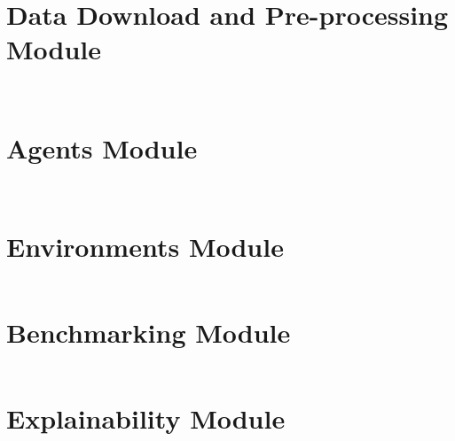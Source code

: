 \section{Data Download and Pre-processing Module}

\inputminted[fontsize=\footnotesize,linenos,breaklines=true,breakanywhere=true,frame=lines,baselinestretch=1]{python}{../preprocessor/findata_downloader.py}

\inputminted[fontsize=\footnotesize,linenos,breaklines=true,breakanywhere=true,frame=lines,baselinestretch=1]{python}{../preprocessor/findata_preprocessor.py}

\section{Agents Module}

\inputminted[fontsize=\footnotesize,linenos,breaklines=true,breakanywhere=true,frame=lines,baselinestretch=1]{python}{../agents/drl_agent.py}

\inputminted[fontsize=\footnotesize,linenos,breaklines=true,breakanywhere=true,frame=lines,baselinestretch=1]{python}{../agents/tb_callback.py}

\section{Environments Module}

\inputminted[fontsize=\footnotesize,linenos,breaklines=true,breakanywhere=true,frame=lines,baselinestretch=1]{python}{../environments/env_portfolio_optimisation.py}

\section{Benchmarking Module}

\inputminted[fontsize=\footnotesize,linenos,breaklines=true,breakanywhere=true,frame=lines,baselinestretch=1]{python}{../pbenchmark/portfolio_benchmark.py}

\section{Explainability Module}


